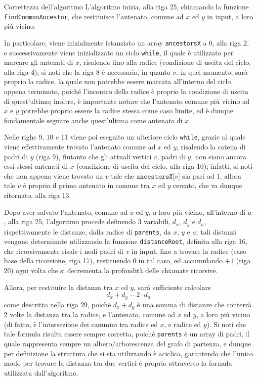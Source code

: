 \documentclass[a4paper, 12pt]{report}
\begin{document}
    \begin{framedobs}{Correttezza dell'algoritmo}
        L'algoritmo inizia, alla riga 25, chiamando la funzione \texttt{findCommonAncestor}, che restituisce l'antenato, comune ad $x$ ed $y$ in input, a loro più vicino.

        In particolare, viene inizialmente istanziato un array \texttt{ancestorsX} a 0, alla riga 2, e successivamente viene inizializzato un ciclo \texttt{while}, il quale è utilizzato per marcare gli antenati di $x$, risalendo fino alla radice (condizione di uscita del ciclo, alla riga 4); si noti che la riga 8 è necessaria, in quanto $v$, in quel momento, sarà proprio la radice, la quale non potrebbe essere marcata all'interno del ciclo appena terminato, poiché l'incontro della radice è proprio la condizione di uscita di quest'ultimo; inoltre, è importante notare che l'antenato comune più vicino ad $x$ e $y$ potrebbe proprio essere la radice stessa come caso limite, ed è dunque fondamentale segnare anche quest'ultima come antenato di $x$.

        Nelle righe 9, 10 e 11 viene poi eseguito un ulteriore ciclo \texttt{while}, grazie al quale viene effettivamente trovato l'antenato comune ad $x$ ed $y$, risalendo la catena di padri di $y$ (riga 9), fintanto che gli attuali vertici $v$, padri di $y$, non siano ancora essi stessi antenati di $x$ (condizione di uscita del ciclo, alla riga 10); infatti, si noti che non appena viene trovato un $v$ tale che $\texttt{ancestorsX[}v\texttt{]}$ sia pari ad 1, allora tale $v$ è proprio il primo antenato in comune tra $x$ ed $y$ cercato, che va dunque ritornato, alla riga 13.

        Dopo aver salvato l'antenato, comune ad $x$ ed $y$, a loro più vicino, all'interno di $a$, alla riga 25, l'algoritmo procede definendo 3 variabili, $d_x$, $d_y$ e $d_a$, rispettivamente le distanze, dalla radice di \texttt{parents}, da $x$, $y$ e $a$; tali distanzi vengono determinate utilizzando la funzione \texttt{distanceRoot}, definita alla riga 16, che ricorsivamente risale i nodi padri di $v$ in input, fino a trovare la radice (caso base della ricorsione, riga 17), restituendo 0 in tal caso, ed accumulando $+1$ (riga 20) ogni volta che si decrementa la profondità delle chiamate ricorsive.

        Allora, per restituire la distanza tra $x$ ed $y$, sarà sufficiente calcolare $$d_x + d_y - 2 \cdot d_a$$ come descritto nella riga 29, poiché $d_x + d_y$ è una somma di distanze che conterrà 2 volte la distanza tra la radice, e l'antenato, comune ad $x$ ed $y$, a loro più vicino (di fatto, è l'intersezione dei cammini tra radice ed $x$, e radice ed $y$). Si noti che tale formula risulta essere sempre corretta, poiché \texttt{parents} è un array di padri, il quale rappresenta sempre un albero/arborescenza del grafo di partenza, e dunque per definizione la struttura che si sta utilizzando è aciclica, garantendo che l'unico modo per trovare la distanza tra due vertici è proprio attraverso la formula utilizzata dall'algoritmo.
    \end{framedobs}
\end{document}
